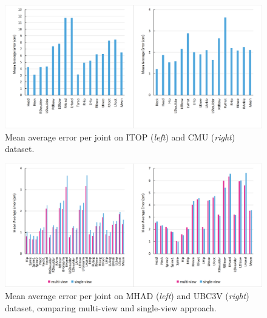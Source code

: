 \begin{figure}[H]
\begin{center}
\centering
\includegraphics[width=\textwidth]{images/results/perjointerr2.png}
\caption[Mean average error per joint on ITOP and CMU dataset.]{Mean average error per joint on ITOP ({\it left}) and CMU ({\it right}) dataset.}
\label{fig:perjointerr2}
\end{center}
\end{figure}

\begin{figure}[H]
\begin{center}
\centering
\includegraphics[width=\textwidth]{images/results/perjointerr1.png}
\caption[Mean average error per joint on MHAD and UBC3V dataset.]{Mean average error per joint on MHAD ({\it left}) and UBC3V ({\it right}) dataset, comparing multi-view and single-view approach.}
\label{fig:perjointerr1}
\end{center}
\end{figure}

